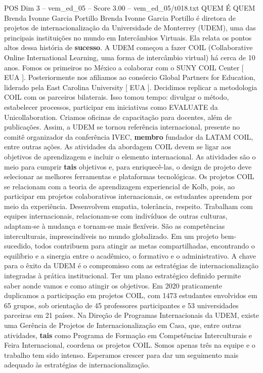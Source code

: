 \begin{textsample}{POS Dim 3 – vem\_ed\_05 – Score 3.00 – vem\_ed\_05/t018.txt}  \label{ex:f3_pos_122}
QUEM É QUEM Brenda Ivonne Garcia Portillo Brenda Ivonne Garcia Portillo é diretora de projetos de internacionalização da Universidade de Monterrey (UDEM), uma das principais instituições no mundo em Intercâmbios Virtuais.
Ela relata os pontos altos dessa história de \textbf{sucesso}.
A UDEM começou a fazer COIL (Collaborative Online International Learning, uma forma de intercâmbio virtual) há cerca de 10 anos.
Fomos os primeiros no México a colaborar com o SUNY COIL Center [ EUA ].
Posteriormente nos afiliamos ao consórcio Global Partners for Education, liderado pela East Carolina University [ EUA ].
Decidimos replicar a metodologia COIL com os parceiros bilaterais.
Isso tomou tempo: divulgar o método, estabelecer processos, participar em iniciativas como EVALUATE da Unicollaboration.
Criamos oficinas de capacitação para docentes, além de publicações.
Assim, a UDEM se tornou referência internacional, presente no comitê organizador da conferência IVEC, \textbf{membro} fundador da LATAM COIL, entre outras ações.
As atividades da abordagem COIL devem se ligar aos objetivos de aprendizagem e incluir o elemento internacional.
As atividades são o meio para cumprir \textbf{tais} objetivos e, para enriquecê-las, o design de projeto deve selecionar as melhores ferramentas e plataformas tecnológicas.
Os projetos COIL se relacionam com a teoria de aprendizagem experiencial de Kolb, pois, ao participar em projetos colaborativos internacionais, os estudantes aprendem por meio da experiência.
Desenvolvem empatia, tolerância, respeito.
Trabalham com equipes internacionais, relacionam-se com indivíduos de outras culturas, adaptam-se à mudança e tornam-se mais flexíveis.
São as competências interculturais, imprescindíveis no mundo globalizado.
Em um projeto bem-sucedido, todos contribuem para atingir as metas compartilhadas, encontrando o equilíbrio e a sinergia entre o acadêmico, o formativo e o administrativo.
A chave para o êxito da UDEM é o compromisso com as estratégias de internacionalização integradas à prática institucional.
Ter um plano estratégico definido permite saber aonde vamos e como atingir os objetivos.
Em 2020 praticamente duplicamos a participação em projetos COIL, com 1473 estudantes envolvidos em 65 grupos, sob orientação de 45 professores participantes e 53 universidades parceiras em 21 países.
Na Direção de Programas Internacionais da UDEM, existe uma Gerência de Projetos de Internacionalização em Casa, que, entre outras atividades, \textbf{tais} como Programa de Formação em Competências Interculturais e Feira Internacional, coordena os projetos COIL.
Somos apenas três na equipe e o trabalho tem sido intenso.
Esperamos crescer para dar um seguimento mais adequado às estratégias de internacionalização.

\end{textsample}
